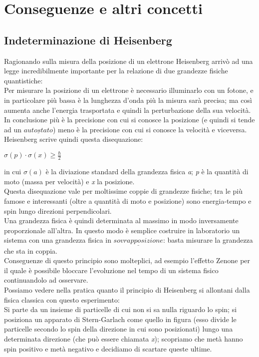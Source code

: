 \section{Conseguenze e altri concetti}
\subsection{Indeterminazione di Heisenberg}
Ragionando sulla misura della posizione di un elettrone Heisenberg arrivò ad una legge incredibilmente importante per la relazione di due grandezze fisiche quantistiche:\\
Per misurare la posizione di un elettrone è necessario illuminarlo con un fotone, e in particolare più bassa è la lunghezza d'onda più la misura sarà precisa; ma così aumenta anche l'energia trasportata e quindi la perturbazione della sua velocità. In conclusione più è la precisione con cui si conosce la posizione (e quindi si tende ad un $\underline{autostato}$) meno è la precisione con cui si conosce la velocità e viceversa. Heisenberg scrive quindi questa disequazione:
\begin{center} \begin{Large}
 $\sigma(\textit{p}) \cdot \sigma (\textit{x}) \geq \frac{\hbar}{2}$ \end{Large} \end{center}
in cui $\sigma(\textit{a})$ è la diviazione standard della grandezza fisica \textit{a}; \textit{p} è la quantità di moto (massa per velocità) e \textit{x} la posizione.\\
Questa disequazione vale per moltissime coppie di grandezze fisiche; tra le più famose e interessanti (oltre a quantità di moto e posizione) sono energia-tempo e spin lungo direzioni perpendicolari.\\
Una grandezza fisica è quindi determinata al massimo in modo inversamente proporzionale all'altra. In questo modo è semplice costruire in laboratorio un sistema con una grandezza fisica in $\underline{sovrapposizione}$: basta misurare la grandezza che sta in coppia.\\
Conseguenze di questo principio sono molteplici, ad esempio l'effetto Zenone per il quale è possibile bloccare l'evoluzione nel tempo di un sistema fisico continuandolo ad osservare.\\
Possiamo vedere nella pratica quanto il principio di Heisenberg si allontani dalla fisica classica con questo esperimento:\\
Si parte da un insieme di particelle di cui non si sa nulla riguardo lo spin; si posiziona un apparato di Stern-Garlach come quello in figura (esso divide le particelle secondo lo spin della direzione in cui sono posizionati) lungo una determinata direzione (che può essere chiamata \textit{x}); scopriamo che metà hanno spin positivo e metà negativo e decidiamo di scartare queste ultime.
